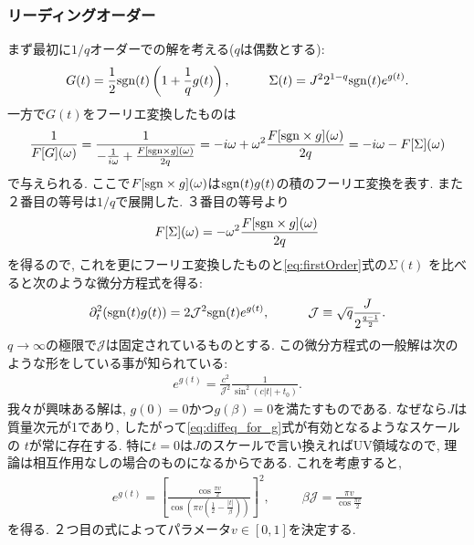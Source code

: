 \subsubsection{リーディングオーダー}
まず最初に$1/q$オーダーでの解を考える($q$は偶数とする):
\begin{align}
  G(t) = \frac{1}{2}\mathrm{sgn}(t)\left(1 + \frac{1}{q}g(t)\right),
  \hspace{30pt}
  \Sigma(t) = J^22^{1-q}\mathrm{sgn}(t)e^{g(t)}.
  \label{eq:firstOrder}
\end{align}
一方で$G(t)$をフーリエ変換したものは
\begin{align}
\frac{1}{F[G](\omega)}
	= \frac{1}{-\frac{1}{i\omega} + \frac{F[\mathrm{sgn} \times g](\omega)}{2q}}
	= -i\omega + \omega^2\frac{F[\mathrm{sgn} \times g](\omega)}{2q}
	= -i\omega - F[\Sigma](\omega)
\end{align}
で与えられる. 
ここで$F[\mathrm{sgn} \times g](\omega)$は$\mathrm{sgn}(t)g(t)$の積のフーリエ変換を表す. 
また２番目の等号は$1/q$で展開した. 
３番目の等号より
\begin{align}
	F[\Sigma](\omega) = -\omega^2\frac{F[\mathrm{sgn} \times g](\omega)}{2q}
\end{align}
を得るので, これを更にフーリエ変換したものと\eqref{eq:firstOrder}式の$\Sigma(t)$
を比べると次のような微分方程式を得る:
\begin{align}
\partial_t^2(\mathrm{sgn}(t)g(t)) = 2\mathcal{J}^2\mathrm{sgn}(t)e^{g(t)},
\hspace{30pt}
\mathcal{J} \equiv \sqrt{q}\frac{J}{2^{\frac{q-1}{2}}}.
\label{eq:diffeq_for_g}
\end{align}
$q \to \infty$の極限で$\mathcal{J}$は固定されているものとする. 
この微分方程式の一般解は次のような形をしている事が知られている:
\begin{align}
e^{g(t)} = \frac{c^2}{\mathcal{J}^2}\frac{1}{\sin^2(c|t| + t_0)}.
\end{align}
我々が興味ある解は, $g(0)=0$かつ$g(\beta)=0$を満たすものである. 
なぜなら$J$は質量次元が1であり, したがって\eqref{eq:diffeq_for_g}式が有効となるようなスケールの
$t$が常に存在する. 
特に$t=0$は$J$のスケールで言い換えればUV領域なので, 理論は相互作用なしの場合のものになるからである. 
これを考慮すると, 
\begin{align}
	e^{g(t)} = \left[
		\frac{\cos\frac{\pi v}{2}}{\cos\left(\pi v(\frac{1}{2} - \frac{|t|}{\beta})\right)}
		\right]^2,
	\hspace{30pt}
	\beta\mathcal{J} = \frac{\pi v}{\cos\frac{\pi v}{2}}
	\label{eq:explicit_g}
\end{align}
を得る. ２つ目の式によってパラメータ$v\in[0, 1]$を決定する. 

